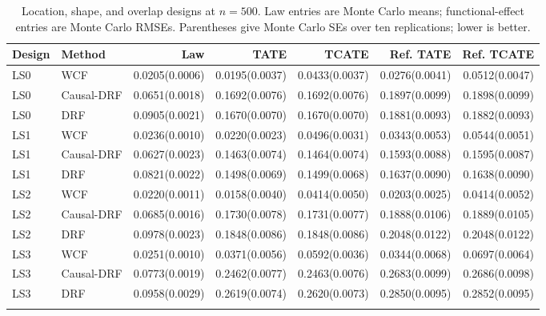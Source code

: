 \begin{table}[t]
\centering
\scriptsize
\setlength{\tabcolsep}{4pt}
\caption{Location, shape, and overlap designs at $n=500$. Law entries are Monte Carlo means; functional-effect entries are Monte Carlo RMSEs. Parentheses give Monte Carlo SEs over ten replications; lower is better.}
\label{tab:full_results_ls_500}
\begin{tabular}{llrrrrr}
\toprule
Design & Method & Law & TATE & TCATE & Ref. TATE & Ref. TCATE \\
\midrule
LS0 & WCF & 0.0205(0.0006) & 0.0195(0.0037) & 0.0433(0.0037) & 0.0276(0.0041) & 0.0512(0.0047) \\
LS0 & Causal-DRF & 0.0651(0.0018) & 0.1692(0.0076) & 0.1692(0.0076) & 0.1897(0.0099) & 0.1898(0.0099) \\
LS0 & DRF & 0.0905(0.0021) & 0.1670(0.0070) & 0.1670(0.0070) & 0.1881(0.0093) & 0.1882(0.0093) \\
\addlinespace
LS1 & WCF & 0.0236(0.0010) & 0.0220(0.0023) & 0.0496(0.0031) & 0.0343(0.0053) & 0.0544(0.0051) \\
LS1 & Causal-DRF & 0.0627(0.0023) & 0.1463(0.0074) & 0.1464(0.0074) & 0.1593(0.0088) & 0.1595(0.0087) \\
LS1 & DRF & 0.0821(0.0022) & 0.1498(0.0069) & 0.1499(0.0068) & 0.1637(0.0090) & 0.1638(0.0090) \\
\addlinespace
LS2 & WCF & 0.0220(0.0011) & 0.0158(0.0040) & 0.0414(0.0050) & 0.0203(0.0025) & 0.0414(0.0052) \\
LS2 & Causal-DRF & 0.0685(0.0016) & 0.1730(0.0078) & 0.1731(0.0077) & 0.1888(0.0106) & 0.1889(0.0105) \\
LS2 & DRF & 0.0978(0.0023) & 0.1848(0.0086) & 0.1848(0.0086) & 0.2048(0.0122) & 0.2048(0.0122) \\
\addlinespace
LS3 & WCF & 0.0251(0.0010) & 0.0371(0.0056) & 0.0592(0.0036) & 0.0344(0.0068) & 0.0697(0.0064) \\
LS3 & Causal-DRF & 0.0773(0.0019) & 0.2462(0.0077) & 0.2463(0.0076) & 0.2683(0.0099) & 0.2686(0.0098) \\
LS3 & DRF & 0.0958(0.0029) & 0.2619(0.0074) & 0.2620(0.0073) & 0.2850(0.0095) & 0.2852(0.0095) \\
\addlinespace
\bottomrule
\end{tabular}
\end{table}
